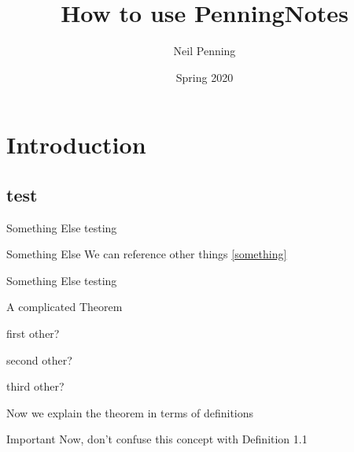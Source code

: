\documentclass{article}
\title{How to use PenningNotes}
\author{Neil Penning}
\date{Spring 2020}
\begin{document}
\maketitle
\setcounter{tocdepth}{3}%
\tableofcontents
\section{Introduction}
\subsection{test}
\begin{boxDefinition}[lower separated = true, sidebyside=true, label=something]{Something Else}
testing
\tcblower
\end{boxDefinition}
\begin{boxNote}[]{Something Else}
We can reference other things \ref{something}
\end{boxNote}
\begin{boxProblem}[]{Something Else}
testing
\end{boxProblem}
\begin{boxTheorem}[lower separated = true, sidebyside=true]{A complicated Theorem}
    \begin{boxDefinition}{first}
        other?
    \end{boxDefinition}
    \begin{boxDefinition}{second}
        other?
    \end{boxDefinition}
    \begin{boxDefinition}{third}
        other?
    \end{boxDefinition}
    \tcblower
    Now we explain the theorem in terms of definitions
    \vspace{1.5in}
    \begin{boxNote}{Important}
        Now, don't confuse this concept with Definition 1.1
    \end{boxNote}
\end{boxTheorem}

	
\end{document}
